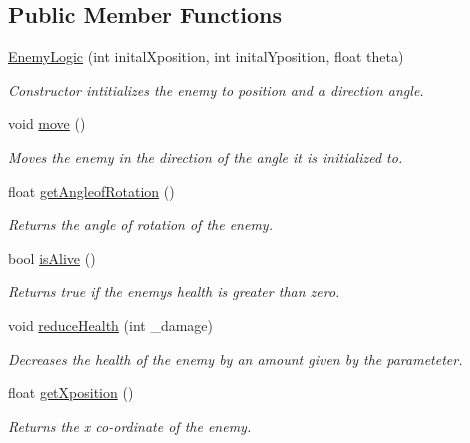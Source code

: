 \subsection*{Public Member Functions}
\begin{DoxyCompactItemize}
\item 
\hyperlink{class_enemy_logic_a6b405895fa7556810b8002b0d276d6cc}{Enemy\+Logic} (int inital\+Xposition, int inital\+Yposition, float theta)
\begin{DoxyCompactList}\small\item\em Constructor intitializes the enemy to position and a direction angle. \end{DoxyCompactList}\item 
void \hyperlink{class_enemy_logic_a2bc8ba642d677ab31f4b54ec00299e25}{move} ()
\begin{DoxyCompactList}\small\item\em Moves the enemy in the direction of the angle it is initialized to. \end{DoxyCompactList}\item 
float \hyperlink{class_enemy_logic_ade03be41505c71de49f20fc855c8fede}{get\+Angleof\+Rotation} ()
\begin{DoxyCompactList}\small\item\em Returns the angle of rotation of the enemy. \end{DoxyCompactList}\item 
bool \hyperlink{class_enemy_logic_a8dd48fa112c41249e46728d7ec8f820e}{is\+Alive} ()
\begin{DoxyCompactList}\small\item\em Returns true if the enemy\textquotesingle{}s health is greater than zero. \end{DoxyCompactList}\item 
void \hyperlink{class_enemy_logic_aaf2f8ff785c8f7410e04cfb3cb192b9b}{reduce\+Health} (int \+\_\+damage)
\begin{DoxyCompactList}\small\item\em Decreases the health of the enemy by an amount given by the parameteter. \end{DoxyCompactList}\item 
float \hyperlink{class_enemy_logic_a7eed969ab8e3d2527cdac04ef39a5aba}{get\+Xposition} ()
\begin{DoxyCompactList}\small\item\em Returns the x co-\/ordinate of the enemy. \end{DoxyCompactList}\item 

\end{DoxyCompactItemize}
